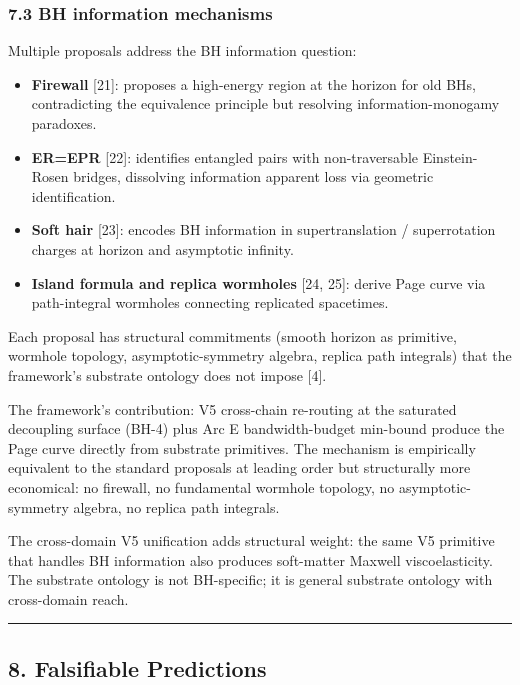 \documentclass[
  11pt,
  a4paperpaper,
]{article}
\providecommand{\tightlist}{%
  \setlength{\itemsep}{0pt}\setlength{\parskip}{0pt}}
\begin{document}
\subsubsection{7.3 BH information
mechanisms}\label{bh-information-mechanisms}

Multiple proposals address the BH information question:

\begin{itemize}
\tightlist
\item
  \textbf{Firewall} {[}21{]}: proposes a high-energy region at the
  horizon for old BHs, contradicting the equivalence principle but
  resolving information-monogamy paradoxes.
\item
  \textbf{ER=EPR} {[}22{]}: identifies entangled pairs with
  non-traversable Einstein-Rosen bridges, dissolving information
  apparent loss via geometric identification.
\item
  \textbf{Soft hair} {[}23{]}: encodes BH information in
  supertranslation / superrotation charges at horizon and asymptotic
  infinity.
\item
  \textbf{Island formula and replica wormholes} {[}24, 25{]}: derive
  Page curve via path-integral wormholes connecting replicated
  spacetimes.
\end{itemize}

Each proposal has structural commitments (smooth horizon as primitive,
wormhole topology, asymptotic-symmetry algebra, replica path integrals)
that the framework's substrate ontology does not impose {[}4{]}.

The framework's contribution: V5 cross-chain re-routing at the saturated
decoupling surface (BH-4) plus Arc E bandwidth-budget min-bound produce
the Page curve directly from substrate primitives. The mechanism is
empirically equivalent to the standard proposals at leading order but
structurally more economical: no firewall, no fundamental wormhole
topology, no asymptotic-symmetry algebra, no replica path integrals.

The cross-domain V5 unification adds structural weight: the same V5
primitive that handles BH information also produces soft-matter Maxwell
viscoelasticity. The substrate ontology is not BH-specific; it is
general substrate ontology with cross-domain reach.

\begin{center}\rule{0.5\linewidth}{0.5pt}\end{center}

\subsection{8. Falsifiable Predictions}\label{falsifiable-predictions}
\end{document}
